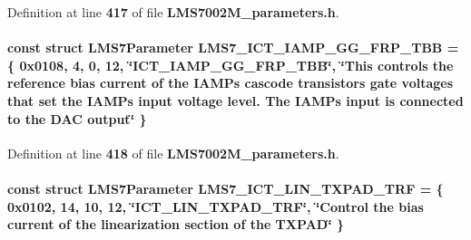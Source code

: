 Definition at line {\bf 417} of file {\bf L\+M\+S7002\+M\+\_\+parameters.\+h}.

\paragraph[{L\+M\+S7\+\_\+\+I\+C\+T\+\_\+\+I\+A\+M\+P\+\_\+\+G\+G\+\_\+\+F\+R\+P\+\_\+\+T\+BB}]{\setlength{\rightskip}{0pt plus 5cm}const struct {\bf L\+M\+S7\+Parameter} L\+M\+S7\+\_\+\+I\+C\+T\+\_\+\+I\+A\+M\+P\+\_\+\+G\+G\+\_\+\+F\+R\+P\+\_\+\+T\+BB = \{ 0x0108, 4, 0, 12, \char`\"{}\+I\+C\+T\+\_\+\+I\+A\+M\+P\+\_\+\+G\+G\+\_\+\+F\+R\+P\+\_\+\+T\+B\+B\char`\"{}, \char`\"{}\+This controls the reference bias current of the I\+A\+M\+P\textquotesingle{}s cascode transistors gate voltages that set the I\+A\+M\+P\textquotesingle{}s input voltage level. The I\+A\+M\+P\textquotesingle{}s input is connected to the D\+A\+C output\char`\"{} \}\hspace{0.3cm}{\ttfamily [static]}}\label{LMS7002M__parameters_8h_a485f5fc66155a1072f5d7ebbc365d580}


Definition at line {\bf 418} of file {\bf L\+M\+S7002\+M\+\_\+parameters.\+h}.

\paragraph[{L\+M\+S7\+\_\+\+I\+C\+T\+\_\+\+L\+I\+N\+\_\+\+T\+X\+P\+A\+D\+\_\+\+T\+RF}]{\setlength{\rightskip}{0pt plus 5cm}const struct {\bf L\+M\+S7\+Parameter} L\+M\+S7\+\_\+\+I\+C\+T\+\_\+\+L\+I\+N\+\_\+\+T\+X\+P\+A\+D\+\_\+\+T\+RF = \{ 0x0102, 14, 10, 12, \char`\"{}\+I\+C\+T\+\_\+\+L\+I\+N\+\_\+\+T\+X\+P\+A\+D\+\_\+\+T\+R\+F\char`\"{}, \char`\"{}\+Control the bias current of the linearization section of the T\+X\+P\+A\+D\char`\"{} \}\hspace{0.3cm}{\ttfamily [static]}}\label{LMS7002M__parameters_8h_ad72ad15af8ddb6da7c70f13a8318d2cc}


